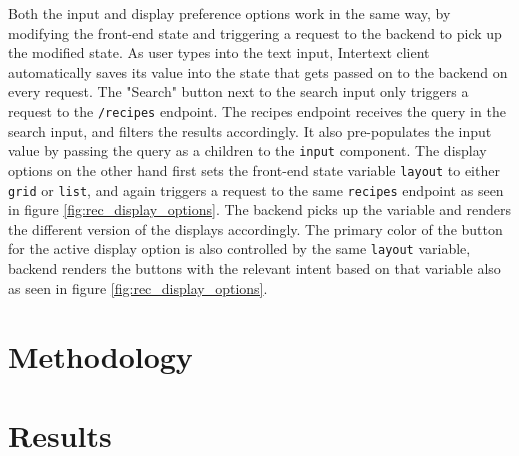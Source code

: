 Both the input and display preference options work in the same way, by modifying the front-end state and triggering a request to the backend to pick up the modified state. As user types into the text input, Intertext client automatically saves its value into the state that gets passed on to the backend on every request. The "Search" button next to the search input only triggers a request to the \texttt{/recipes} endpoint. The recipes endpoint receives the query in the search input, and filters the results accordingly. It also pre-populates the input value by passing the query as a children to the \texttt{input} component. The display options on the other hand first sets the front-end state variable \texttt{layout} to either \texttt{grid} or \texttt{list}, and again triggers a request to the same \texttt{recipes} endpoint as seen in figure \ref{fig:rec_display_options}. The backend picks up the variable and renders the different version of the displays accordingly. The primary color of the button for the active display option is also controlled by the same \texttt{layout} variable, backend renders the buttons with the relevant intent based on that variable also as seen in figure \ref{fig:rec_display_options}.


\section{Methodology}

\section{Results}